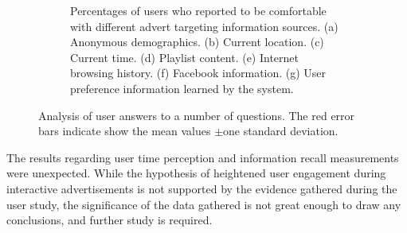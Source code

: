 \begin{figure}[h!]
\begin{subfigure}[t]{0.49\textwidth}
			\caption{Percentages of users who reported to be comfortable with different advert targeting information sources. (a) Anonymous demographics. (b) Current location. (c) Current time. (d) Playlist content. (e) Internet browsing history. (f) Facebook information. (g) User preference information learned by the system.}
		\end{subfigure}
		\caption{Analysis of user answers to a number of questions. The red error bars indicate show the mean values $\pm$one standard deviation.}
		\label{fig:qualitative_results}
	\end{figure}

	The results regarding user time perception and information recall measurements were unexpected. While the hypothesis of heightened user engagement during interactive advertisements is not supported by the evidence gathered during the user study, the significance of the data gathered is not great enough to draw any conclusions, and further study is required.
